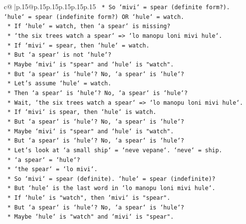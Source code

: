 \documentclass{article}
\begin{document}
{\begin{supertabular}{c@{$\;$}|p{.15\linewidth}@{}p{.15\linewidth}p{.15\linewidth}p{.15\linewidth}p{.15\linewidth}p{.15\linewidth}}
{{{\texttt{                *   So `mivi` = spear (definite form?). `hule` = spear (indefinite form?) OR `hule` = watch.} \\
\texttt{                *   If `hule` = watch, then `a spear` is missing?} \\
\texttt{                *   `the six trees watch a spear` => `lo manopu loni mivi hule`.} \\
\texttt{                *   If `mivi` = spear, then `hule` = watch.} \\
\texttt{                *   But `a spear` is not `hule`?} \\
\texttt{                *   Maybe `mivi` is "spear" and `hule` is "watch".} \\
\texttt{                *   But `a spear` is `hule`? No, `a spear` is `hule`?} \\
\texttt{                *   Let's assume `hule` = watch.} \\
\texttt{                *   Then `a spear` is `hule`? No, `a spear` is `hule`?} \\
\texttt{                *   Wait, `the six trees watch a spear` => `lo manopu loni mivi hule`.} \\
\texttt{                *   If `mivi` is spear, then `hule` is watch.} \\
\texttt{                *   But `a spear` is `hule`? No, `a spear` is `hule`?} \\
\texttt{                *   Maybe `mivi` is "spear" and `hule` is "watch".} \\
\texttt{                *   But `a spear` is `hule`? No, `a spear` is `hule`?} \\
\texttt{                *   Let's look at `a small ship` = `neve vepane`. `neve` = ship.} \\
\texttt{                *   `a spear` = `hule`?} \\
\texttt{                *   `the spear` = `lo mivi`.} \\
\texttt{                *   So `mivi` = spear (definite). `hule` = spear (indefinite)?} \\
\texttt{                *   But `hule` is the last word in `lo manopu loni mivi hule`.} \\
\texttt{                *   If `hule` is "watch", then `mivi` is "spear".} \\
\texttt{                *   But `a spear` is `hule`? No, `a spear` is `hule`?} \\
\texttt{                *   Maybe `hule` is "watch" and `mivi` is "spear".} \\
}}}
\end{supertabular}}
\end{document}
